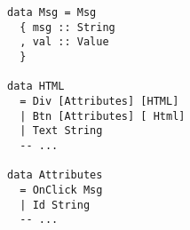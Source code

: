\begin{verbatim}
data Msg = Msg
  { msg :: String
  , val :: Value
  }

data HTML
  = Div [Attributes] [HTML]
  | Btn [Attributes] [ Html]
  | Text String
  -- ...

data Attributes
  = OnClick Msg
  | Id String
  -- ...
\end{verbatim}
